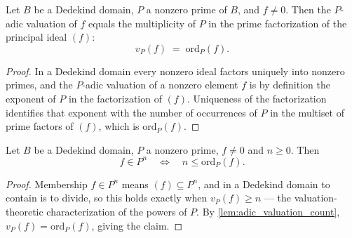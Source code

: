 \begin{lemma}
  \label{lem:adic_valuation_count}
  \leanok
  Let \(B\) be a Dedekind domain, \(P\) a nonzero prime of \(B\), and \(f \neq 0\).
  Then the \(P\)-adic valuation of \(f\) equals the multiplicity of \(P\) in the prime
  factorization of the principal ideal \((f)\):
  \[
    v_P(f) \;=\; \mathrm{ord}_P(f) .
  \]
\end{lemma}
\begin{proof}
  \leanok
  In a Dedekind domain every nonzero ideal factors uniquely into nonzero primes, and
  the \(P\)-adic valuation of a nonzero element \(f\) is by definition the exponent of
  \(P\) in the factorization of \((f)\). Uniqueness of the factorization identifies
  that exponent with the number of occurrences of \(P\) in the multiset of prime
  factors of \((f)\), which is \(\mathrm{ord}_P(f)\).
\end{proof}

\begin{lemma}
  \label{lem:mem_pow_iff_le_count}
  \leanok
  Let \(B\) be a Dedekind domain, \(P\) a nonzero prime, \(f \neq 0\) and \(n \ge 0\).
  Then
  \[
    f \in P^n \quad\Longleftrightarrow\quad n \le \mathrm{ord}_P(f) .
  \]
\end{lemma}
\begin{proof}
  \leanok
  Membership \(f \in P^n\) means \((f) \subseteq P^n\), and in a Dedekind domain to
  contain is to divide, so this holds exactly when \(v_P(f) \ge n\) --- the
  valuation-theoretic characterization of the powers of \(P\). By
  \ref{lem:adic_valuation_count}, \(v_P(f) = \mathrm{ord}_P(f)\), giving the claim.
\end{proof}

